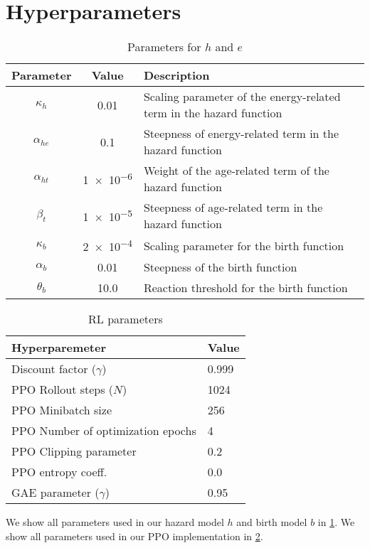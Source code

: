 \section{Hyperparameters}\label{ap:param}

\begin{table}[t]
  \centering
  \caption{Parameters for $h$ and $e$}\label{tab:bd-param}
  \begin{tabular}{ccl}
  \toprule
    Parameter & Value & Description \\
    \midrule
    $\kappa_{h}$ & 0.01 & Scaling parameter of the energy-related term in the hazard function \\
    $\alpha_{he}$ & 0.1 & Steepness of energy-related term in the hazard function \\
    $\alpha_{ht}$ & \num{1e-6} & Weight of the age-related term of the hazard function \\
    $\beta_{t}$ & \num{1e-5} & Steepness of age-related term in the hazard function \\
    $\kappa_{b}$ & \num{2e-4} & Scaling parameter for the birth function\\
    $\alpha_{b}$ & 0.01 & Steepness of the birth function \\
    $\theta_{b}$ & 10.0 & Reaction threshold for the birth function \\
    \bottomrule
  \end{tabular}
\end{table}

\begin{table}[t]
  \centering
  \caption{RL parameters}\label{tab:rl-param}
  \begin{tabular}{ll}
  \toprule
    Hyperparemeter & Value \\
    \midrule
    Discount factor ($\gamma$) & 0.999 \\
    PPO Rollout steps ($N$) & 1024 \\
    PPO Minibatch size & 256 \\
    PPO Number of optimization epochs & 4 \\
    PPO Clipping parameter & 0.2 \\
    PPO entropy coeff. & 0.0 \\
    GAE parameter ($\gamma$) & 0.95 \\
  \end{tabular}
\end{table}

We show all parameters used in our hazard model $h$ and birth model $b$ in \cref{tab:bd-param}.
We show all parameters used in our PPO implementation in \cref{tab:rl-param}.